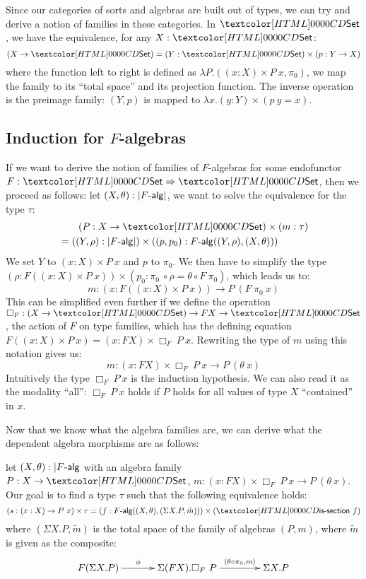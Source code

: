 Since our categories of sorts and algebras are built out of types, we
can try and derive a notion of families in these categories. In
$\Set$, we have the equivalence, for any $X : \Set$:
$$
(X \to \Set) = (Y : \Set) \times (p : Y \to X)
$$
where the function left to right is defined as
$\lambda P . ((x : X) \times P\ x , \pi_0)$, \ie we map the family to
its ``total space'' and its projection function. The inverse operation
is the preimage family: $(Y,p)$ is mapped to
$\lambda x . (y : Y) \times (p\ y = x)$. 

\subsection{Induction for $F$-algebras}
If we want to derive the notion of families of $F$-algebras for some
endofunctor $F : \Func{\Set}{\Set}$, then we proceed as follows: let
$(X,\theta) : | \algcat{F} |$, we want to solve the equivalence for
the type $\tau$:
%
\begin{align*}
&\ \ \ \ \ \ (P : X \to \Set) \times (m : \tau) \\
&= ((Y,\rho) : | \algcat{F} |) \times ((p,p_0) : \algcat{F}((Y,\rho),(X,\theta)))  
\end{align*}
%
We set $Y$ to $(x : X) \times P\ x$ and $p$ to $\pi_0$. We then have
to simplify the type
$(\rho : F ((x : X) \times P\ x)) \times (p_0 : \pi_0\ \circ \rho =
\theta \circ F\ \pi_0)$, which leads us to:
$$
m : (x : F ((x : X) \times P\ x)) \to P\ (F\ \pi_0\ x)
$$
This can be simplified even further if we define the operation
$\Box_F : (X \to \Set) \to FX \to \Set$, \ie the action of $F$ on type
families, which has the defining equation
$F ((x : X) \times P\ x) = (x : FX) \times \Box_F\ P\
x$. Rewriting the type of $m$ using this notation gives us:
$$
m : (x : FX) \times \Box_F\ P\ x \to P\ (\theta\ x)
$$
Intuitively the type $\Box_F\ P\ x$ is the induction hypothesis. We
can also read it as the modality ``all'': $\Box_F\ P\ x$ holds if $P$
holds for all values of type $X$ ``contained'' in $x$.

Now that we know what the algebra families are, we can derive what the
dependent algebra morphisms are as follows:

let $(X,\theta) : | \algcat{F}$ with an algebra family
$P : X \to \Set$,
$m : (x : FX) \times \Box_F\ P\ x \to P\ (\theta\ x)$. Our goal is to
find a type $\tau$ such that the following equivalence holds:
$$
(s : (x : X) \to P\ x) \times \tau = (f : \algcat{F}((X,\theta),(\Sigma X . P , \tilde{m}))) \times (\issection\ f)
$$
where $(\Sigma X . P , \tilde{m})$ is the total space of the family of
algebras $(P,m)$, where $\tilde{m}$ is given as the composite:
$$
\xymatrix@!C{
  F (\Sigma X . P)
  \ar[r]^-{\phi}
  &\Sigma (FX) . \Box_F\ P
  \ar[r]^-{\langle \theta \circ \pi_0 , m \rangle}
  &\Sigma X . P
}
$$



